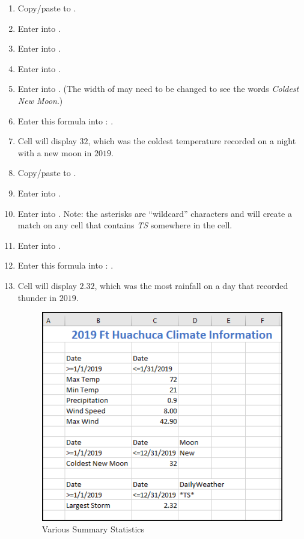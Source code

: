 \begin{enumerate}[resume]
	\item Copy/paste  to .
	\item Enter  into .
	\item Enter  into .
	\item Enter  into .
	\item Enter  into . (The width of  may need to be changed to see the words \textit{Coldest New Moon}.)
	\item Enter this formula into : .
	\item Cell  will display $ 32 $, which was the coldest temperature recorded on a night with a new moon in $ 2019 $.

	\item Copy/paste  to .
	\item Enter  into .
	\item Enter  into . Note: the asterisks are ``wildcard'' characters and will create a match on any cell that contains \textit{TS} somewhere in the cell.
	\item Enter  into .
	\item Enter this formula into : .
	\item Cell  will display $ 2.32 $, which was the most rainfall on a day that recorded thunder in $ 2019 $.
	
	\begin{figure}[H]
		\centering
		\includegraphics[width=\maxwidth{.95\linewidth}]{gfx/ch09_fig87}
		\caption{Various Summary Statistics}
		\label{09:fig87}
	\end{figure}
	
\end{enumerate}	

